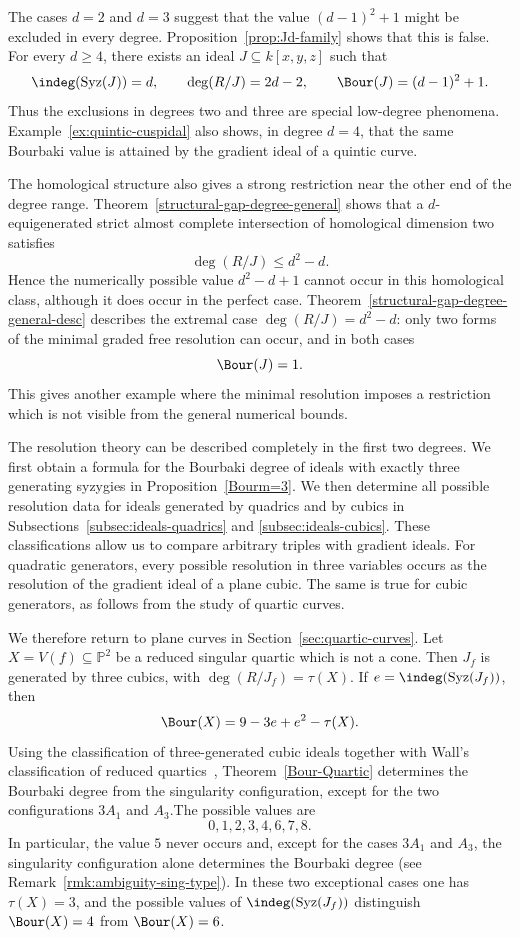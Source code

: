\documentclass[11pt]{amsart} %
\theoremstyle{definition}
\def\syz{\mbox{\rm Syz}}
\def\NZQ{\mathbb}               %
\def\PP{{\NZQ P}}
\begin{document}
The cases $d=2$ and $d=3$ suggest that the value $(d-1)^2+1$ might be excluded in every degree. Proposition~\ref{prop:Jd-family}
shows that this is false. For every $d\ge4$, there exists an ideal
$J\subseteq k[x,y,z]$ such that
\[
\indeg(\syz(J))=d,\qquad
\deg(R/J)=2d-2,\qquad
\Bour(J)=(d-1)^2+1.
\]
Thus the exclusions in degrees two and three are special low-degree
phenomena. Example~\ref{ex:quintic-cuspidal} also shows, in degree
$d=4$, that the same Bourbaki value is attained by the gradient ideal
of a quintic curve.

The homological structure also gives a strong restriction near the
other end of the degree range. Theorem~\ref{structural-gap-degree-general}
shows that a $d$-equigenerated strict almost complete intersection of
homological dimension two satisfies
\[
\deg(R/J)\le d^2-d.
\]
Hence the numerically possible value $d^2-d+1$ cannot occur in this
homological class, although it does occur in the perfect case.
Theorem~\ref{structural-gap-degree-general-desc} describes the extremal
case $\deg(R/J)=d^2-d$: only two forms of the minimal graded free
resolution can occur, and in both cases
\[
\Bour(J)=1.
\]
This gives another example where the minimal resolution imposes a
restriction which is not visible from the general numerical bounds.

The resolution theory can be described completely in the first two
degrees. We first obtain a formula for the Bourbaki degree of ideals
with exactly three generating syzygies in
Proposition~\ref{Bourm=3}. We then determine all possible resolution
data for ideals generated by quadrics and by cubics in
Subsections~\ref{subsec:ideals-quadrics} and
\ref{subsec:ideals-cubics}. These classifications allow us to compare
arbitrary triples with gradient ideals. For quadratic generators, every
possible resolution in three variables occurs as the resolution of the
gradient ideal of a plane cubic. The same is true for cubic generators,
as follows from the study of quartic curves.

We therefore return to plane curves in
Section~\ref{sec:quartic-curves}. Let
$X=V(f)\subseteq\PP^2$ be a reduced singular quartic which is not a
cone. Then $J_f$ is generated by three cubics, with
$\deg(R/J_f)=\tau(X)$. If $e=\indeg(\syz(J_f))$, then
\[
\Bour(X)=9-3e+e^2-\tau(X).
\]
Using the classification of three-generated cubic ideals together with
Wall's classification of reduced quartics~\cite{Wall-quartics},
Theorem~\ref{Bour-Quartic} determines the Bourbaki degree from the singularity configuration, except for the two configurations $3A_1$
and $A_3$.The possible values
are
\[
0,1,2,3,4,6,7,8.
\]
In particular, the value $5$ never occurs and, except for the cases $3A_1$ and $A_3$, the singularity configuration alone determines the Bourbaki degree (see Remark~\ref{rmk:ambiguity-sing-type}).
In these two exceptional cases one has $\tau(X)=3$, and the
possible values of $\indeg(\syz(J_f))$ distinguish
$\Bour(X)=4$ from $\Bour(X)=6$.
\end{document}
